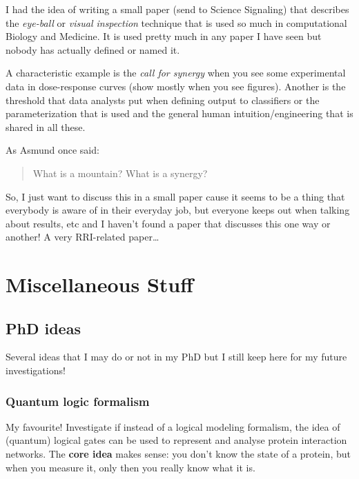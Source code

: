 \documentclass[12pt,]{book}
\begin{document}
I had the idea of writing a small paper (send to Science Signaling) that describes the \emph{eye-ball} or
\emph{visual inspection} technique that is used so much in computational Biology and
Medicine. It is used pretty much in any paper I have seen but nobody has actually
defined or named it.

A characteristic example is the \emph{call for synergy} when you see some
experimental data in dose-response curves (show mostly when you see figures). Another is the threshold that data analysts put when defining output to classifiers or the parameterization that is used and the general human intuition/engineering that is shared in all these.

As Asmund once said:

\begin{quote}
What is a mountain? What is a synergy?
\end{quote}

So, I just want to discuss this in a small paper cause it seems to be a
thing that everybody is aware of in their everyday job, but everyone keeps out
when talking about results, etc and I haven't found a paper that discusses this
one way or another!
A very RRI-related paper\ldots{}

\hypertarget{part-miscellaneous-stuff}{%
\part*{Miscellaneous Stuff}\label{part-miscellaneous-stuff}}

\hypertarget{ideas}{%
\chapter{PhD ideas}\label{ideas}}

Several ideas that I may do or not in my PhD but I still keep here for my future
investigations!

\hypertarget{quantum}{%
\section{Quantum logic formalism}\label{quantum}}

My favourite! Investigate if instead of a logical modeling formalism, the idea
of (quantum) logical gates can be used to represent and analyse protein interaction
networks.
The \textbf{core idea} makes sense: you don't know the state of a protein, but when
you measure it, only then you really know what it is.
\end{document}
